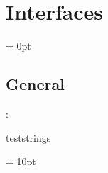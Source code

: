 
\section{Interfaces} 


\parskip = 0pt

\vspace{3mm} \subsection*{General}

: 

teststrings
\vspace{2mm}

\vspace{5mm}\parskip = 10pt 
